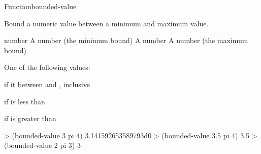 \documentclass[10pt,twoside,english,pdftex]{article}
\begin{document}
\begin{functiondoc}{Function}{bounded-value}{
  \returns{} }
%

\fnsyntax

\fnpurpose Bound a numeric value between a minimum and maximum value.

\fnpackage {}

\fnmodule {}

\fnargs
\begin{args}{number}
\arg[min] A number (the minimum bound)
\arg[number] A number
\arg[max] A number (the maximum bound)
\end{args}

\fnreturns One of the following values:
\begin{tightitemize}
\item {} if it between  and , inclusive
\item {} if  is less than 
\item {} if  is greater than 
\end{tightitemize}

\fnexamples
\begin{example}
> (bounded-value 3 pi 4)
3.141592653589793d0
> (bounded-value 3.5 pi 4)
3.5
> (bounded-value 2 pi 3)
3
\end{example}

\end{functiondoc}

\end{document}
